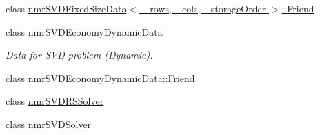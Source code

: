 \begin{DoxyCompactItemize}
class \hyperlink{classnmr_s_v_d_fixed_size_data_1_1_friend}{nmr\+S\+V\+D\+Fixed\+Size\+Data$<$ \+\_\+rows, \+\_\+cols, \+\_\+storage\+Order $>$\+::\+Friend}
\item 
class \hyperlink{classnmr_s_v_d_economy_dynamic_data}{nmr\+S\+V\+D\+Economy\+Dynamic\+Data}
\begin{DoxyCompactList}\small\item\em Data for S\+V\+D problem (Dynamic). \end{DoxyCompactList}\item 
class \hyperlink{classnmr_s_v_d_economy_dynamic_data_1_1_friend}{nmr\+S\+V\+D\+Economy\+Dynamic\+Data\+::\+Friend}
\item 
class \hyperlink{classnmr_s_v_d_r_s_solver}{nmr\+S\+V\+D\+R\+S\+Solver}
\item 
class \hyperlink{classnmr_s_v_d_solver}{nmr\+S\+V\+D\+Solver}
\end{DoxyCompactItemize}

